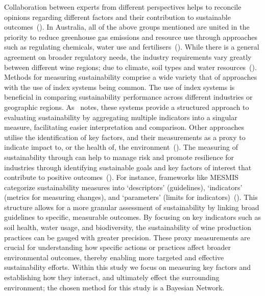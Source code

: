 \documentclass[fleqn,10pt]{wlscirep}
\begin{document}
Collaboration between experts from different perspectives helps to reconcile opinions regarding different factors and their contribution to sustainable outcomes~(\cite{dichiaraCollaborativeApproachAchieving2024}). In Australia, all of the above groups mentioned are united in the priority to reduce greenhouse gas emissions and resource use through approaches such as regulating chemicals, water use and fertilisers~(\cite{dumbrellComparingAustralianPublic2024}). While there is a general agreement on broader regulatory needs, the industry requirements vary greatly between different wine regions; due to climate, soil types and water resources~(\cite{abbalDecisionSupportSystem2016,agostaRegionalClimateVariability2012}).
% 
Methods for measuring sustainability comprise a wide variety that of approaches with the use of index systems being common. The use of index systems is beneficial in comparing sustainability performance across different industries or geographic regions. As~\cite{gehringerMappingSustainabilityMeasurement2024} notes, these systems provide a structured approach to evaluating sustainability by aggregating multiple indicators into a singular measure, facilitating easier interpretation and comparison.
Other approaches utilise the identification of key factors, and their measurements as a proxy to indicate impact to, or the health of, the environment~(\cite{floresWhatSustainabilityWine2018}). The measuring of sustainability through can help to manage risk and promote resilience for industries through identifying sustainable goals and key factors of interest that contribute to positive outcomes~(\cite{klemesAssessingMeasuringEnvironmental2015, beckerSustainabilityScienceManaging2024}). For instance, frameworks like MESMIS categorize sustainability measures into `descriptors' (guidelines), `indicators' (metrics for measuring changes), and `parameters' (limits for indicators)~(\cite{klemes_assessing_2015}). This structure allows for a more granular assessment of sustainability by linking broad guidelines to specific, measurable outcomes. By focusing on key indicators such as soil health, water usage, and biodiversity, the sustainability of wine production practices can be gauged with greater precision. These proxy measurements are crucial for understanding how specific actions or practices affect broader environmental outcomes, thereby enabling more targeted and effective sustainability efforts. Within this study we focus on measuring key factors and establishing how they interact, and ultimately effect the surrounding environment; the chosen method for this study is a Bayesian Network.
\end{document}
